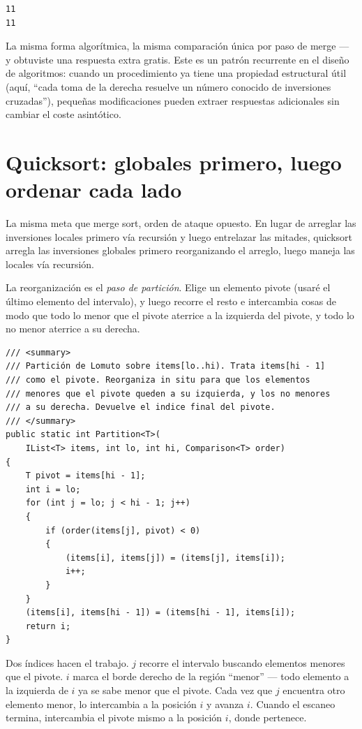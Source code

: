 \documentclass[11pt,a4paper]{article}
\begin{document}
\begin{verbatim}
11
11
\end{verbatim}

La misma forma algorítmica, la misma comparación única por paso de merge --- y obtuviste una respuesta extra gratis. Este es un patrón recurrente en el diseño de algoritmos: cuando un procedimiento ya tiene una propiedad estructural útil (aquí, ``cada toma de la derecha resuelve un número conocido de inversiones cruzadas''), pequeñas modificaciones pueden extraer respuestas adicionales sin cambiar el coste asintótico.

\section{Quicksort: globales primero, luego ordenar cada lado}

La misma meta que merge sort, orden de ataque opuesto. En lugar de arreglar las inversiones locales primero vía recursión y luego entrelazar las mitades, quicksort arregla las inversiones globales primero reorganizando el arreglo, luego maneja las locales vía recursión.

La reorganización es el \emph{paso de partición}. Elige un elemento pivote (usaré el último elemento del intervalo), y luego recorre el resto e intercambia cosas de modo que todo lo menor que el pivote aterrice a la izquierda del pivote, y todo lo no menor aterrice a su derecha.

\begin{lstlisting}[caption={Partición de Lomuto}]
/// <summary>
/// Partición de Lomuto sobre items[lo..hi). Trata items[hi - 1]
/// como el pivote. Reorganiza in situ para que los elementos
/// menores que el pivote queden a su izquierda, y los no menores
/// a su derecha. Devuelve el indice final del pivote.
/// </summary>
public static int Partition<T>(
    IList<T> items, int lo, int hi, Comparison<T> order)
{
    T pivot = items[hi - 1];
    int i = lo;
    for (int j = lo; j < hi - 1; j++)
    {
        if (order(items[j], pivot) < 0)
        {
            (items[i], items[j]) = (items[j], items[i]);
            i++;
        }
    }
    (items[i], items[hi - 1]) = (items[hi - 1], items[i]);
    return i;
}
\end{lstlisting}

Dos índices hacen el trabajo. $j$ recorre el intervalo buscando elementos menores que el pivote. $i$ marca el borde derecho de la región ``menor'' --- todo elemento a la izquierda de $i$ ya se sabe menor que el pivote. Cada vez que $j$ encuentra otro elemento menor, lo intercambia a la posición $i$ y avanza $i$. Cuando el escaneo termina, intercambia el pivote mismo a la posición $i$, donde pertenece.
\end{document}
